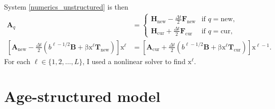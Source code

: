 \documentclass[USenglish]{article}
\renewcommand{\vec}[1]{\boldsymbol{\mathrm{#1}}}
\newcommand{\mat}[1]{\mathbf{#1}}
\begin{document}
System \eqref{numerics_unstructured} is then
\begin{subequations}
  \label{step_unstructured}
  \begin{align}
    \mat{A}_q &=
    \begin{cases}
      \mat{H}_{\mathrm{new}} - \frac{\Delta t}{2} \mat{F}_{\mathrm{new}}
      & \text{if $q = \mathrm{new}$},
      \\
      \mat{H}_{\mathrm{cur}} + \frac{\Delta t}{2} \mat{F}_{\mathrm{cur}}
      & \text{if $q = \mathrm{cur}$},
    \end{cases}
    \\
    \left[
      \mat{A}_{\mathrm{new}}
      - \frac{\Delta t}{2} \left(
        b^{\ell - 1 / 2} \mat{B}
        + \vec{\beta} \vec{x}^{\ell} \mat{T}_{\mathrm{new}}
      \right)
    \right]
    \vec{x}^{\ell} &=
    \left[
      \mat{A}_{\mathrm{cur}}
      + \frac{\Delta t}{2} \left(
        b^{\ell - 1 / 2} \mat{B}
        + \vec{\beta} \vec{x}^{\ell} \mat{T}_{\mathrm{cur}}
      \right)
    \right]
    \vec{x}^{\ell - 1}.
  \end{align}
\end{subequations}
For each $\ell \in \{1, 2, \ldots, L\}$, I used a nonlinear
solver to find $\vec{x}^{\ell}$.


\section{Age-structured model}
\end{document}

